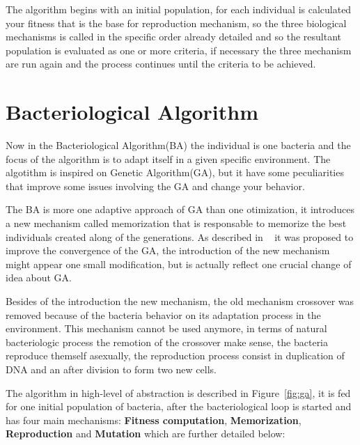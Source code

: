 The algorithm begins with an initial population, for each individual is calculated
your fitness that is the base for reproduction mechanism, so the three biological
mechanisms is called in the specific order already detailed and so the resultant
population is evaluated as one or more criteria, if necessary the three mechanism
are run again and the process continues until the criteria to be achieved.

\section{Bacteriological Algorithm}

Now in the Bacteriological Algorithm(BA) the individual is one bacteria and the focus
of the algorithm is to adapt itself in a given specific environment. The algotithm
is inspired on Genetic Algorithm(GA), but it have some peculiarities that improve
some issues involving the GA and change your behavior.

The BA is more one adaptive approach of GA than one otimization, it introduces a
new mechanism called memorization that is responsable to memorize the best individuals
created along of the generations. As described in ~\cite{baudry} it was proposed
to improve the convergence of the GA, the introduction of the new mechanism might
appear one small modification, but is actually reflect one crucial change of idea
about GA.

Besides of the introduction the new mechanism, the old mechanism crossover was
removed because of the bacteria behavior on its adaptation process in the
environment. This mechanism cannot be used anymore, in terms of natural bacteriologic
process the remotion of the crossover make sense, the bacteria reproduce themself
asexually, the reproduction process consist in duplication of DNA and an after
division to form two new cells.

The algorithm in high-level of abstraction is described in Figure~\ref{fig:ga},
it is fed for one initial population of bacteria, after the bacteriological loop
is started and has four main mechanisms: {\bf Fitness computation}, {\bf Memorization},
{\bf Reproduction} and {\bf Mutation} which are further detailed below:

